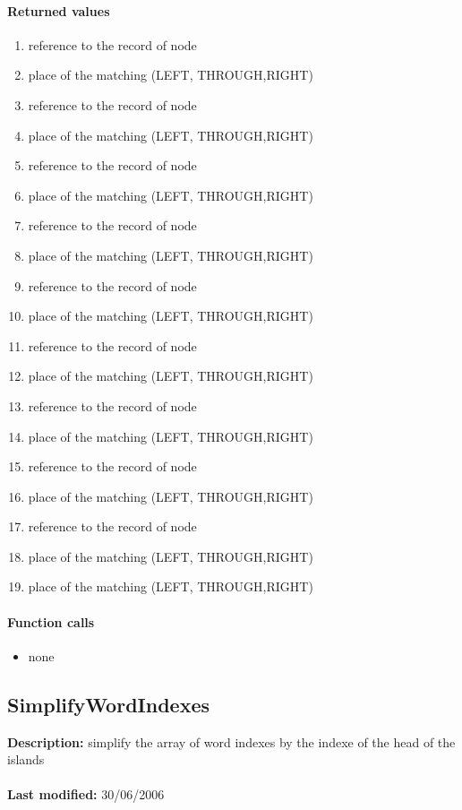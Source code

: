 \paragraph{Returned values}
\begin{enumerate}
\item reference to the record of node
\item place of the matching (LEFT, THROUGH,RIGHT)
\item reference to the record of node
\item place of the matching (LEFT, THROUGH,RIGHT)
\item reference to the record of node
\item place of the matching (LEFT, THROUGH,RIGHT)
\item reference to the record of node
\item place of the matching (LEFT, THROUGH,RIGHT)
\item reference to the record of node
\item place of the matching (LEFT, THROUGH,RIGHT)
\item reference to the record of node
\item place of the matching (LEFT, THROUGH,RIGHT)
\item reference to the record of node
\item place of the matching (LEFT, THROUGH,RIGHT)
\item reference to the record of node
\item place of the matching (LEFT, THROUGH,RIGHT)
\item reference to the record of node
\item place of the matching (LEFT, THROUGH,RIGHT)
\item place of the matching (LEFT, THROUGH,RIGHT)
\end{enumerate}

\paragraph{Function calls}
\begin{itemize}
\item none
\end{itemize}

\subsection{SimplifyWordIndexes}
\textbf{Description:} simplify the array of word indexes by the indexe of the head of the islands\\
\\\textbf{Last modified:} 30/06/2006

